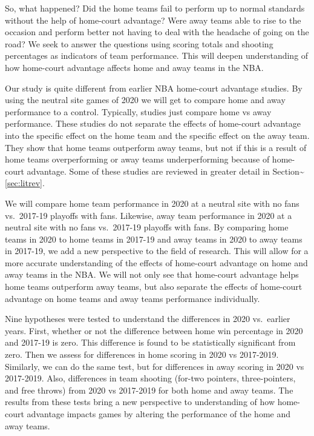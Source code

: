 \documentclass[12pt, letterpaper, titlepage]{article}
\begin{document}
So, what happened? Did the home teams fail to perform up to normal standards
without the help of home-court advantage? Were away teams able to rise to
the occasion and perform better not having to deal with the headache of going
on the road? We seek to answer the questions using scoring totals and shooting
percentages as indicators of team performance. This will deepen understanding
of how home-court advantage affects home and away teams in the NBA.

Our study is quite different from earlier NBA home-court advantage studies.
By using the neutral site games of 2020 we will get to compare home and away
performance to a control. Typically, studies just compare home vs away
performance. These studies do not separate the effects of home-court advantage
into the specific effect on the home team and the specific effect on the away
team. They show that home teams outperform away teams, but not if this is a
result of home teams overperforming or away teams underperforming because of
home-court advantage. Some of these studies are reviewed in greater detail in
Section\textasciitilde\ref{sec:litrev}.

We will compare home team performance in 2020 at a neutral site with
no fans vs.~2017-19 playoffs with fans. Likewise, away team performance in 2020
at a neutral site with no fans vs.~2017-19 playoffs with fans. By comparing home
teams in 2020 to home teams in 2017-19 and away teams in 2020 to away teams in
2017-19, we add a new perspective to the field of research. This will allow for
a more accurate understanding of the effects of home-court advantage on home and
away teams in the NBA. We will not only see that home-court advantage helps home
teams outperform away teams, but also separate the
effects of home-court advantage on home teams and away teams performance individually.

Nine hypotheses were tested to understand the differences in 2020 vs.~earlier
years. First, whether or not the difference between home win percentage in 2020
and 2017-19 is zero. This difference is found to be statistically
significant from zero. Then we assess for differences in home
scoring in 2020 vs 2017-2019. Similarly, we can do the same test, but for
differences in away scoring in 2020 vs 2017-2019. Also, differences in team
shooting (for-two pointers, three-pointers, and free throws) from 2020 vs 2017-2019
for both home and away teams. The results from these tests bring a new perspective
to understanding of how home-court advantage impacts games by altering the performance
of the home and away teams.
\end{document}
